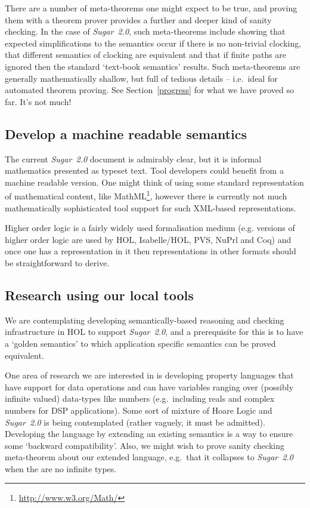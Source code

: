 \documentclass{llncs}
\newcommand\Sugar{{\it{Sugar~2.0}}\xspace}
\newcommand\Hol{HOL\xspace}
\newcommand\HOL{\Hol}
\begin{document}
There are a number of meta-theorems one might expect to be true, and
proving them with a theorem prover provides a further and deeper kind
of sanity checking.  In the case of \Sugar, such meta-theorems include
showing that expected simplifications to the semantics occur if
there is no non-trivial clocking, that different semantics of clocking
are equivalent and that if finite paths are ignored then the standard
`text-book semantics' results. Such meta-theorems are generally mathematically
shallow, but full of tedious details -- i.e.~ideal for automated
theorem proving. See Section~\ref{progress} for what we have proved so far. It's not much!


\subsection{Develop a machine readable semantics}

The current \Sugar document is admirably clear, but it is informal mathematics presented
as typeset text. Tool developers  could benefit from a machine readable version.
One might think of using some standard representation of mathematical content,
like  MathML\footnote{\url{http://www.w3.org/Math/}}, however there is currently
not much mathematically sophisticated tool support for such XML-based representations. 

Higher order logic is a fairly widely used formalisation medium
(e.g. versions of higher order logic are used by \Hol,
Isabelle/HOL, PVS, NuPrl and Coq) and once one has a representation
in it then representations in other formats should be straightforward
to derive.

\subsection{Research using our local tools}


We are contemplating developing semantically-based reasoning and checking infrastructure in \HOL to
support \Sugar, and a prerequisite for this is to have a `golden semantics' to which application
specific semantics can be proved equivalent.

One area of research we are interested in is developing property
languages that have support for data operations and can have variables
ranging over (possibly infinite valued) data-types like numbers
(e.g.~including reals and complex numbers for DSP applications). Some
sort of mixture of Hoare Logic and \Sugar is being contemplated
(rather vaguely, it must be admitted).  Developing the language by extending
an existing semantics is a way to ensure some `backward compatibility'.
Also, we might wish to prove sanity
checking meta-theorem about our extended language, e.g.~that it
collapses to \Sugar when the are no infinite types. 
\end{document}
